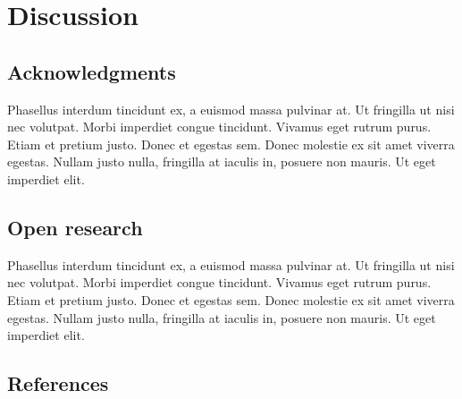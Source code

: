 \documentclass[
  number]{elsarticle}
\begin{document}
\section{Discussion}\label{discussion}

\subsection{Acknowledgments}\label{acknowledgments}

Phasellus interdum tincidunt ex, a euismod massa pulvinar at. Ut
fringilla ut nisi nec volutpat. Morbi imperdiet congue tincidunt.
Vivamus eget rutrum purus. Etiam et pretium justo. Donec et egestas sem.
Donec molestie ex sit amet viverra egestas. Nullam justo nulla,
fringilla at iaculis in, posuere non mauris. Ut eget imperdiet elit.

\subsection{Open research}\label{open-research}

Phasellus interdum tincidunt ex, a euismod massa pulvinar at. Ut
fringilla ut nisi nec volutpat. Morbi imperdiet congue tincidunt.
Vivamus eget rutrum purus. Etiam et pretium justo. Donec et egestas sem.
Donec molestie ex sit amet viverra egestas. Nullam justo nulla,
fringilla at iaculis in, posuere non mauris. Ut eget imperdiet elit.

\subsection*{References}\label{references}

\renewcommand{\bibsection}{}

\end{document}
